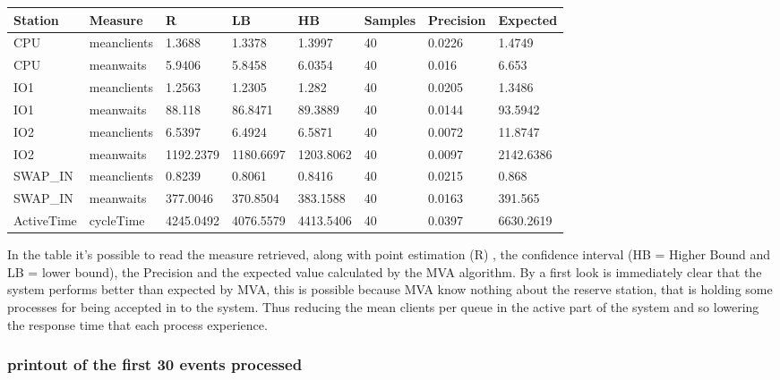 \documentclass[12pt,a4paper]{article}
\begin{document}
\begin{table}[!ht]
    \centering
    \begin{tabular}{|l|l|l|l|l|l|l|l|}
    \hline
        Station & Measure & R & LB & HB & Samples & Precision & Expected \\ \hline
        CPU & meanclients & 1.3688 & 1.3378 & 1.3997 & 40 & 0.0226 & 1.4749 \\ \hline
        CPU & meanwaits & 5.9406 & 5.8458 & 6.0354 & 40 & 0.016 & 6.653 \\ \hline
        IO1 & meanclients & 1.2563 & 1.2305 & 1.282 & 40 & 0.0205 & 1.3486 \\ \hline
        IO1 & meanwaits & 88.118 & 86.8471 & 89.3889 & 40 & 0.0144 & 93.5942 \\ \hline
        IO2 & meanclients & 6.5397 & 6.4924 & 6.5871 & 40 & 0.0072 & 11.8747 \\ \hline
        IO2 & meanwaits & 1192.2379 & 1180.6697 & 1203.8062 & 40 & 0.0097 & 2142.6386 \\ \hline
        SWAP\_IN & meanclients & 0.8239 & 0.8061 & 0.8416 & 40 & 0.0215 & 0.868 \\ \hline
        SWAP\_IN & meanwaits & 377.0046 & 370.8504 & 383.1588 & 40 & 0.0163 & 391.565 \\ \hline
        ActiveTime & cycleTime & 4245.0492 & 4076.5579 & 4413.5406 & 40 & 0.0397 & 6630.2619 \\ \hline
    \end{tabular}
\end{table}

In the table it's possible to read the measure retrieved, along with point estimation (R) , the confidence interval (HB = Higher Bound and LB = lower bound), the Precision and the expected value calculated by the MVA algorithm. By a first look is immediately clear that the system performs better than expected by MVA, this is possible because MVA know nothing about the reserve station, that is holding some processes for being accepted in to the system. Thus reducing the mean clients per queue in the active part of the system and so lowering the response time that each process experience.

\pagebreak
\subsubsection{printout of the first 30 events processed}
\end{document}
